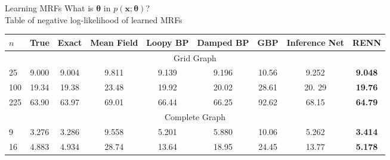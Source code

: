 \begin{frame}
  {Learning MRFs}
  What is $\bm{\theta}$ in $p(\bm{x};\bm{\theta})$?\\
  Table of negative log-likelihood of learned MRFs \\
  \begin{adjustbox}{width=1\textwidth}
    \begin{tabular}{lcccccccc}
      \toprule
      $n$ & True & Exact & Mean Field & Loopy BP & Damped BP & GBP & Inference Net & RENN \\
      \toprule
      \multicolumn{9}{c}{Grid Graph}\\
      \midrule
      25  &  9.000  &  9.004  &  9.811  &  {9.139}  &  9.196  &  10.56  &  9.252  &  \textbf{9.048}  \\
      100 &  19.34  &  19.38  &  23.48  &  {19.92}  &  20.02  &  28.61  &  20. 29  &  \textbf{19.76} \\
      225 &  63.90  &  63.97  &  69.01  &  66.44    &  66.25  &  92.62  &  68.15  &  \textbf{64.79}  \\
      \toprule
      \multicolumn{9}{c}{Complete Graph}\\
      \midrule
      9  &  3.276  &  3.286  &  9.558  &  5.201  &  5.880  &  10.06  &  5.262  & \textbf{3.414}  \\
      16  &  4.883  &  4.934  &  28.74  &  13.64  &  18.95  &  24.45  &  13.77  &  \textbf{5.178}  \\

      \bottomrule
    \end{tabular}
  \end{adjustbox}
\end{frame}

